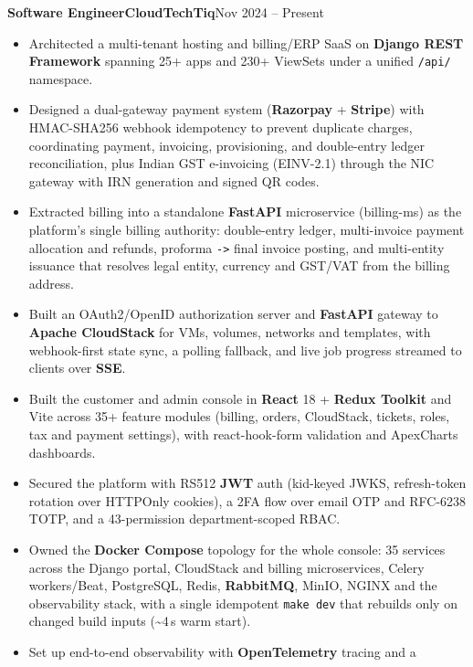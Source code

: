 \documentclass[11pt,a4paper]{article}
\newcommand{\entry}[3]{%
  \vspace{4.5pt}\noindent\textbf{#1}\hfill\textbf{#2}\hfill{\color{subtlegray}#3}\par\vspace{2pt}}
\begin{document}
\entry{Software Engineer}{CloudTechTiq}{Nov 2024 -- Present}
\begin{itemize}
  \item Architected a multi-tenant hosting and billing/ERP SaaS on \textbf{Django
        REST Framework} spanning 25+ apps and 230+ ViewSets under a unified
        \texttt{/api/} namespace.
  \item Designed a dual-gateway payment system (\textbf{Razorpay} +
        \textbf{Stripe}) with HMAC-SHA256 webhook idempotency to prevent duplicate
        charges, coordinating payment, invoicing, provisioning, and double-entry
        ledger reconciliation, plus Indian GST e-invoicing (EINV-2.1) through the
        NIC gateway with IRN generation and signed QR codes.
  \item Extracted billing into a standalone \textbf{FastAPI} microservice
        (billing-ms) as the platform's single billing authority: double-entry
        ledger, multi-invoice payment allocation and refunds, proforma
        \texttt{->} final invoice posting, and multi-entity issuance that
        resolves legal entity, currency and GST/VAT from the billing address.
  \item Built an OAuth2/OpenID authorization server and \textbf{FastAPI}
        gateway to \textbf{Apache CloudStack} for VMs, volumes, networks and
        templates, with webhook-first state sync, a polling fallback, and live
        job progress streamed to clients over \textbf{SSE}.
  \item Built the customer and admin console in \textbf{React} 18 +
        \textbf{Redux Toolkit} and Vite across 35+ feature modules (billing,
        orders, CloudStack, tickets, roles, tax and payment settings), with
        react-hook-form validation and ApexCharts dashboards.
  \item Secured the platform with RS512 \textbf{JWT} auth (kid-keyed JWKS,
        refresh-token rotation over HTTPOnly cookies), a 2FA flow over email OTP
        and RFC-6238 TOTP, and a 43-permission department-scoped RBAC.
  \item Owned the \textbf{Docker Compose} topology for the whole console: 35
        services across the Django portal, CloudStack and billing microservices,
        Celery workers/Beat, PostgreSQL, Redis, \textbf{RabbitMQ}, MinIO, NGINX
        and the observability stack, with a single idempotent \texttt{make dev}
        that rebuilds only on changed build inputs (\textasciitilde4\,s warm start).
  \item Set up end-to-end observability with \textbf{OpenTelemetry} tracing and a

\end{itemize}
\end{document}
